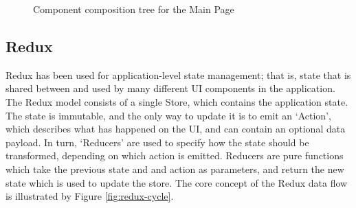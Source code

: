 \begin{figure}[h!]
  \begin{center}
    \caption{Component composition tree for the Main Page}
    \label{fig:main-components}
  \end{center}
\end{figure}

\subsection{Redux}
Redux has been used for application-level state management; that is, state that is shared between and used by many different UI components in the application. The Redux model consists of a single Store, which contains the application state. The state is immutable, and the only way to update it is to emit an `Action', which describes what has happened on the UI, and can contain an optional data payload. In turn, `Reducers' are used to specify how the state should be transformed, depending on which action is emitted. Reducers are pure functions which take the previous state and and action as parameters, and return the new state which is used to update the store. The core concept of the Redux data flow is illustrated by Figure \ref{fig:redux-cycle}.

